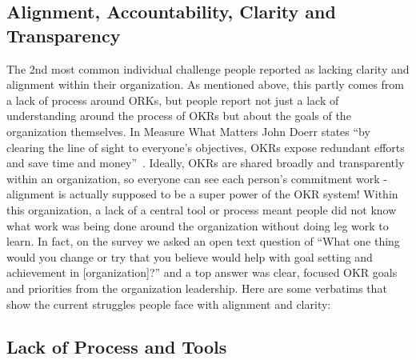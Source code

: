\documentclass[sigconf, nonacm]{acmart}
\begin{document}
\subsection{Alignment, Accountability, Clarity and Transparency}

The 2nd most common individual challenge people reported as lacking clarity and alignment within their organization. As mentioned above, this partly comes from a lack of process around ORKs, but people report not just a lack of understanding around the process of OKRs but about the goals of the organization themselves. In Measure What Matters John Doerr states ``by clearing the line of sight to everyone's objectives, OKRs expose redundant efforts and save time and money''~\cite{Doerr01}. Ideally, OKRs are shared broadly and transparently within an organization, so everyone can see each person's commitment work - alignment is actually supposed to be a super power of the OKR system! Within this organization, a lack of a central tool or process meant people did not know what work was being done around the organization without doing leg work to learn. In fact, on the survey we asked an open text question of ``What one thing would you change or try that you believe would help with goal setting and achievement in [organization]?'' and a top answer was clear, focused OKR goals and priorities from the organization leadership. Here are some verbatims that show the current struggles people face with alignment and clarity:





\subsection{Lack of Process and Tools}
\end{document}
